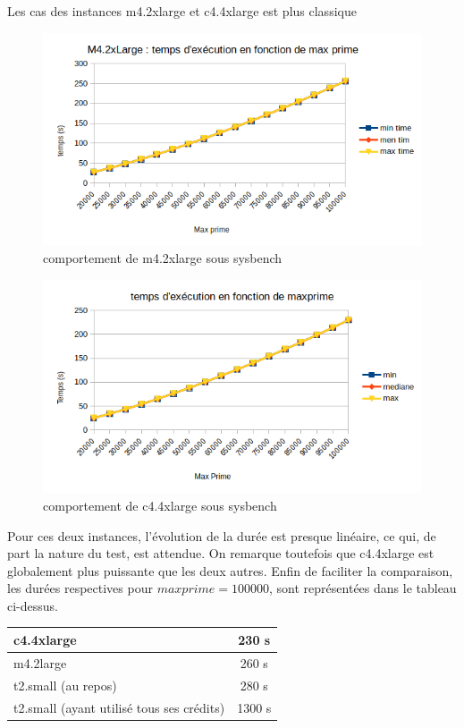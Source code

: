 \documentclass[11pt]{article}
\begin{document}
Les cas des instances m4.2xlarge et c4.4xlarge est plus classique
\begin{figure}
\centering
\includegraphics[width=0.9\linewidth]{images/cpuMLargeRaw}
\caption{comportement de m4.2xlarge sous sysbench}
\label{fig:cpumlargeraw}
\end{figure}
\begin{figure}
\centering
\includegraphics[width=0.9\linewidth]{images/cpuCLargeRAW}
\caption{comportement de c4.4xlarge sous sysbench}
\label{fig:cpuclargeraw}
\end{figure}

Pour ces deux instances, l'évolution de la durée est presque linéaire, ce qui, de part la nature du test, est attendue. On remarque toutefois que c4.4xlarge est globalement plus puissante que les deux autres. Enfin de faciliter la comparaison, les durées respectives pour $max prime = 100000$, sont représentées dans le tableau ci-dessus.
\newline
\begin{center}
	\begin{tabular}{|l|c|}
		\hline 
		c4.4xlarge & 230 s\\ 
		\hline 
		m4.2large & 260 s\\ 
		\hline 
		t2.small (au repos) & 280 s\\ 
		\hline 
		t2.small (ayant utilisé tous ses crédits) & 1300 s\\ 
		\hline 
	\end{tabular}
\end{center} 
\end{document}

